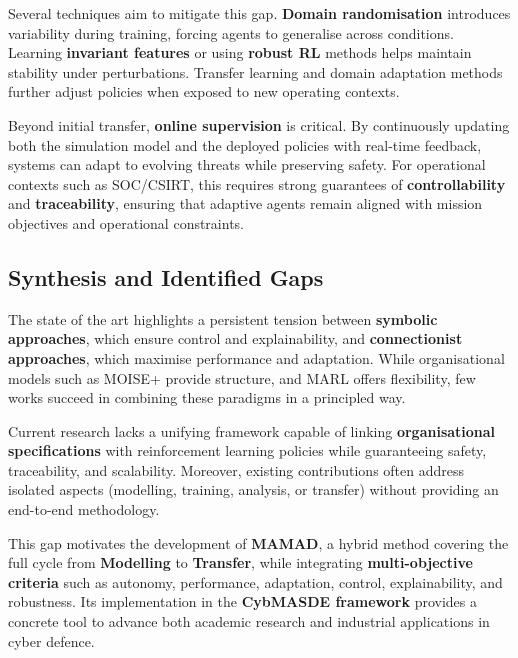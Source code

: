 \documentclass[a4paper,10pt,twocolumn]{article}
\begin{document}
Several techniques aim to mitigate this gap. \textbf{Domain
    randomisation} introduces variability during training, forcing agents
to generalise across conditions. Learning \textbf{invariant features}
or using \textbf{robust RL} methods helps maintain stability under
perturbations. Transfer learning and domain adaptation methods
\cite{Taylor2009} further adjust policies when exposed to new operating
contexts.

Beyond initial transfer, \textbf{online supervision} is critical. By
continuously updating both the simulation model and the deployed
policies with real-time feedback, systems can adapt to evolving threats
while preserving safety. For operational contexts such as SOC/CSIRT,
this requires strong guarantees of \textbf{controllability} and
\textbf{traceability}, ensuring that adaptive agents remain aligned with
mission objectives and operational constraints.

\subsection{Synthesis and Identified Gaps}

The state of the art highlights a persistent tension between
\textbf{symbolic approaches}, which ensure control and explainability,
and \textbf{connectionist approaches}, which maximise performance and
adaptation. While organisational models such as MOISE+ provide
structure, and MARL offers flexibility, few works succeed in combining
these paradigms in a principled way.

Current research lacks a unifying framework capable of linking
\textbf{organisational specifications} with reinforcement learning
policies while guaranteeing safety, traceability, and scalability.
Moreover, existing contributions often address isolated aspects
(modelling, training, analysis, or transfer) without providing an
end-to-end methodology.

This gap motivates the development of \textbf{MAMAD}, a hybrid method
covering the full cycle from \textbf{Modelling} to \textbf{Transfer},
while integrating \textbf{multi-objective criteria} such as autonomy,
performance, adaptation, control, explainability, and robustness. Its
implementation in the \textbf{CybMASDE framework} provides a concrete
tool to advance both academic research and industrial applications in
cyber defence.



\end{document}
